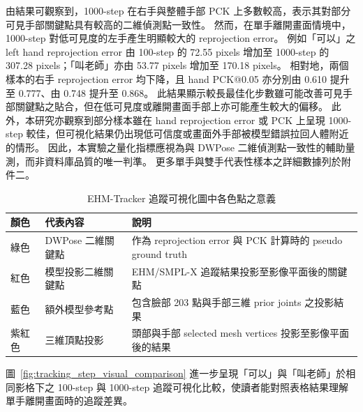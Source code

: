 \documentclass[class=NCU_thesis, crop=false]{standalone}
\begin{document}
由結果可觀察到，1000-step 在右手與整體手部 PCK 上多數較高，表示其對部分可見手部關鍵點具有較高的二維偵測點一致性。
然而，在單手離開畫面情境中，1000-step 對低可見度的左手產生明顯較大的 reprojection error。
例如「可以」之 left hand reprojection error 由 100-step 的 72.55 pixels 增加至 1000-step 的 307.28 pixels；「叫老師」亦由 53.77 pixels 增加至 170.18 pixels。
相對地，兩個樣本的右手 reprojection error 均下降，且 hand PCK@0.05 亦分別由 0.610 提升至 0.777、由 0.748 提升至 0.868。
此結果顯示較長最佳化步數雖可能改善可見手部關鍵點之貼合，但在低可見度或離開畫面手部上亦可能產生較大的偏移。
此外，本研究亦觀察到部分樣本雖在 hand reprojection error 或 PCK 上呈現 1000-step 較佳，但可視化結果仍出現低可信度或畫面外手部被模型錯誤拉回人體附近的情形。
因此，本實驗之量化指標應視為與 DWPose 二維偵測點一致性的輔助量測，而非資料庫品質的唯一判準。
更多單手與雙手代表性樣本之詳細數據列於附件二。 %

\begin{table}[H]
\centering
\caption{EHM-Tracker 追蹤可視化圖中各色點之意義}
\label{tab:tracking_visual_keypoint_colors}
\begin{tabular}{lll}
\toprule
顏色 & 代表內容 & 說明 \\
\midrule
綠色 & DWPose 二維關鍵點 & 作為 reprojection error 與 PCK 計算時的 pseudo ground truth \\
紅色 & 模型投影二維關鍵點 & EHM/SMPL-X 追蹤結果投影至影像平面後的關鍵點 \\
藍色 & 額外模型參考點 & 包含臉部 203 點與手部三維 prior joints 之投影結果 \\
紫紅色 & 三維頂點投影 & 頭部與手部 selected mesh vertices 投影至影像平面後的結果 \\
\bottomrule
\end{tabular}
\end{table}

圖~\ref{fig:tracking_step_visual_comparison} 進一步呈現「可以」與「叫老師」於相同影格下之 100-step 與 1000-step 追蹤可視化比較，使讀者能對照表格結果理解單手離開畫面時的追蹤差異。
\end{document}
